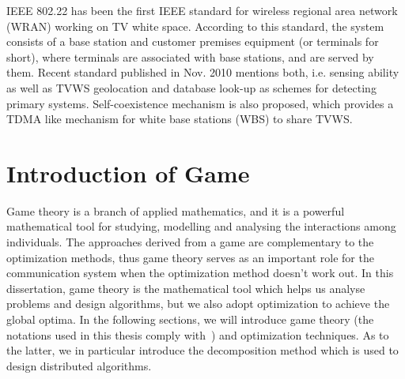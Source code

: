 IEEE 802.22 has been the first IEEE standard for wireless regional area network (WRAN) working on TV white space. According to this standard, the system consists of a base station and customer premises equipment (or terminals for short), where terminals are associated with base stations, and are served by them. Recent standard published in Nov. 2010 mentions both, i.e. sensing ability as well as TVWS geolocation and database look-up as schemes for detecting primary systems. Self-coexistence mechanism is also proposed, which provides a TDMA like mechanism for white base stations (\gls{WBS}) to share TVWS. 
 
 







 

\section{Introduction of Game}
 
Game theory is a branch of applied mathematics, and it is a powerful mathematical tool for studying, modelling and analysing the interactions among individuals.
The approaches derived from a game are complementary to the optimization methods, thus game theory serves as an important role for the communication system when the optimization method doesn't work out.
In this dissertation, game theory is the mathematical tool which helps us analyse problems and design algorithms, but we also adopt optimization to achieve the global optima.
In the following sections, we will introduce game theory (the notations used in this thesis comply with~\cite{agt_book}) and optimization techniques. 
As to the latter, we in particular introduce the decomposition method which is used to design distributed algorithms.


